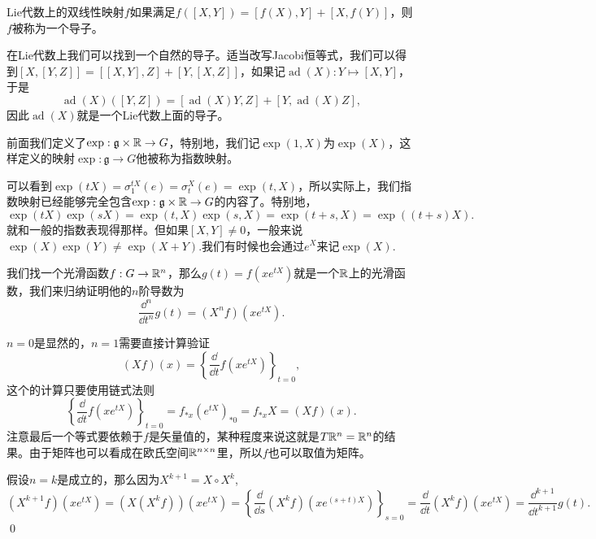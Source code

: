 \documentclass[9pt]{extarticle}
\newcommand{\lag}{{\mathfrak{g}}}
\DeclareMathOperator{\ad}{ad}
\begin{document}
\para Lie代数上的双线性映射$f$如果满足$f([X,Y])=[f(X),Y]+[X,f(Y)]$，则$f$被称为一个导子。

在Lie代数上我们可以找到一个自然的导子。适当改写Jacobi恒等式，我们可以得到$[X,[Y,Z]]=[[X,Y],Z]+[Y,[X,Z]]$，如果记$\ad(X):Y\mapsto [X,Y]$，于是
\[
	\ad(X)([Y,Z])=[\ad(X)Y,Z]+[Y,\ad(X)Z],
\]
因此$\ad(X)$就是一个Lie代数上面的导子。

\para 前面我们定义了$\exp:\lag\times \rr\to G$，特别地，我们记$\exp(1,X)$为$\exp(X)$，这样定义的映射$\exp:\lag\to G$他被称为指数映射。

可以看到$\exp(tX)=\sigma^{tX}_1(e)=\sigma^{X}_t(e)=\exp(t,X)$，所以实际上，我们指数映射已经能够完全包含$\exp:\lag\times \rr\to G$的内容了。特别地，
\[
	\exp(tX)\exp(sX)=\exp(t,X)\exp(s,X)=\exp(t+s,X)=\exp((t+s)X).
\]
就和一般的指数表现得那样。但如果$[X,Y]\neq 0$，一般来说$\exp(X)\exp(Y)\neq \exp(X+Y)$.我们有时候也会通过$e^{X}$来记$\exp(X)$.

\lem \label{exp}我们找一个光滑函数$f:G\to \mathbb{R}^n$，那么$g(t)=f(xe^{tX})$就是一个$\mathbb{R}$上的光滑函数，我们来归纳证明他的$n$阶导数为
\[
	\frac{\dd^n}{\dd t^n}g(t)=(X^nf)(x e^{tX}).
\]

\proof $n=0$是显然的，$n=1$需要直接计算验证
\[
	(Xf)(x)=\left\{\frac{\dd}{\dd t}f(x e^{tX})\right\}_{t=0},
\]
这个的计算只要使用链式法则
\[
	\left\{\frac{\dd}{\dd t}f(x e^{tX})\right\}_{t=0}=f_{*x}(e^{tX})_{*0}=f_{*x}X=(Xf)(x).
\]
注意最后一个等式要依赖于$f$是矢量值的，某种程度来说这就是$T\mathbb{R}^n=\mathbb{R}^n$的结果。由于矩阵也可以看成在欧氏空间$\mathbb{R}^{n\times n}$里，所以$f$也可以取值为矩阵。

假设$n=k$是成立的，那么因为$X^{k+1}=X\circ X^k$,
\[
	(X^{k+1}f)(x e^{tX})=(X(X^{k}f))(x e^{tX})=\left\{\frac{\dd}{\dd s}(X^kf)(x e^{(s+t)X})\right\}_{s=0}=\frac{\dd}{\dd t}(X^kf)(x e^{tX})=\frac{\dd^{k+1}}{\dd t^{k+1}}g(t).
\]\qed


\end{document}

